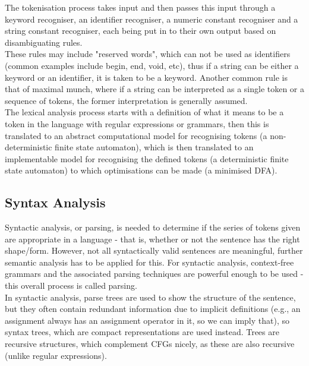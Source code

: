 The tokenisation process takes input and then passes this input through a keyword recogniser, an identifier recogniser, a numeric constant recogniser and a string constant recogniser, each being put in to their own output based on disambiguating rules.\\

These rules may include "reserved words", which can not be used as identifiers (common examples include begin, end, void, etc), thus if a string can be either a keyword or an identifier, it is taken to be a keyword. Another common rule is that of maximal munch, where if a string can be interpreted as a single token or a sequence of tokens, the former interpretation is generally assumed.\\


The lexical analysis process starts with a definition of what it means to be a token in the language with regular expressions or grammars, then this is translated to an abstract computational model for recognising tokens (a non-deterministic finite state automaton), which is then translated to an implementable model for recognising the defined tokens (a deterministic finite state automaton) to which optimisations can be made (a minimised DFA).




\subsection{Syntax Analysis }

Syntactic analysis, or parsing, is needed to determine if the series of tokens given are appropriate in a language - that is, whether or not the sentence has the right shape/form. However, not all syntactically valid sentences are meaningful, further semantic analysis has to be applied for this. For syntactic analysis, context-free grammars and the associated parsing techniques are powerful enough to be used - this overall process is called parsing.\\

In syntactic analysis, parse trees are used to show the structure of the sentence, but they often contain redundant information due to implicit definitions (e.g., an assignment always has an assignment operator in it, so we can imply that), so syntax trees, which are compact representations are used instead. Trees are recursive structures, which complement CFGs nicely, as these are also recursive (unlike regular expressions).\\

